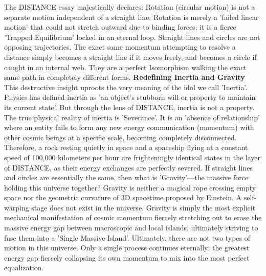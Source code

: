 The DISTANCE essay majestically declares: Rotation (circular motion) is not a separate motion independent of a straight line. Rotation is merely a 'failed linear motion' that could not stretch outward due to binding forces; it is a fierce 'Trapped Equilibrium' locked in an eternal loop. Straight lines and circles are not opposing trajectories. The exact same momentum attempting to resolve a distance simply becomes a straight line if it moves freely, and becomes a circle if caught in an internal web. They are a perfect Isomorphism walking the exact same path in completely different forms.
\textbf{Redefining Inertia and Gravity} \\
This destructive insight uproots the very meaning of the idol we call 'Inertia'. Physics has defined inertia as 'an object's stubborn will or property to maintain its current state'. But through the lens of DISTANCE, inertia is not a property. The true physical reality of inertia is 'Severance'. It is an 'absence of relationship' where an entity fails to form any new energy communication (momentum) with other cosmic beings at a specific scale, becoming completely disconnected. Therefore, a rock resting quietly in space and a spaceship flying at a constant speed of 100,000 kilometers per hour are frighteningly identical states in the layer of DISTANCE, as their energy exchanges are perfectly severed.
If straight lines and circles are essentially the same, then what is 'Gravity'—the massive force holding this universe together? Gravity is neither a magical rope crossing empty space nor the geometric curvature of 3D spacetime proposed by Einstein. A self-warping stage does not exist in the universe. Gravity is simply the most explicit mechanical manifestation of cosmic momentum fiercely stretching out to erase the massive energy gap between macroscopic and local islands, ultimately striving to fuse them into a 'Single Massive Island'.
Ultimately, there are not two types of motion in this universe. Only a single process continues eternally: the greatest energy gap fiercely collapsing its own momentum to mix into the most perfect equalization.

